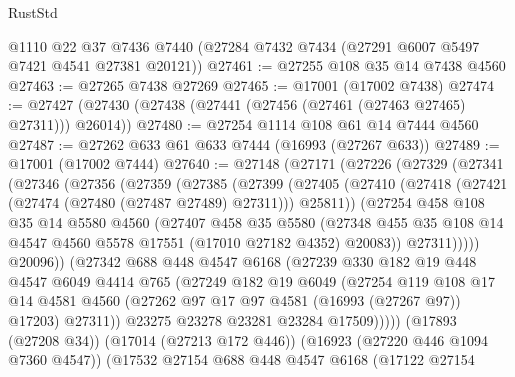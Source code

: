\begin{lexlean}{RustStd}
\begin{coremodule}
    @1110
    @22
    @37
    @7436
    @7440
    (@27284 @7432 @7434 (@27291 @6007 @5497 @7421 @4541 @27381 @20121))
@27461 := @27255 @108 @35 @14 @7438 @4560
@27463 := @27265 @7438 @27269
@27465 := @17001 (@17002 @7438)
@27474 := @27427 (@27430 (@27438 (@27441 (@27456 (@27461 (@27463 @27465) @27311))) @26014))
@27480 := @27254 @1114 @108 @61 @14 @7444 @4560
@27487 := @27262 @633 @61 @633 @7444 (@16993 (@27267 @633))
@27489 := @17001 (@17002 @7444)
@27640 := @27148
    (@27171
      (@27226
        (@27329
          (@27341
            (@27346
              (@27356
                (@27359
                  (@27385
                    (@27399
                      (@27405
                        (@27410 (@27418 (@27421 (@27474 (@27480 (@27487 @27489) @27311))) @25811))
                        (@27254
                          @458
                          @108
                          @35
                          @14
                          @5580
                          @4560
                          (@27407
                            @458
                            @35
                            @5580
                            (@27348
                              @455
                              @35
                              @108
                              @14
                              @4547
                              @4560
                              @5578
                              @17551
                              (@17010 @27182 @4352)
                              @20083))
                          @27311)))))
                @20096))
            (@27342
              @688
              @448
              @4547
              @6168
              (@27239
                @330
                @182
                @19
                @448
                @4547
                @6049
                @4414
                @765
                (@27249
                  @182
                  @19
                  @6049
                  (@27254
                    @119
                    @108
                    @17
                    @14
                    @4581
                    @4560
                    (@27262 @97 @17 @97 @4581 (@16993 (@27267 @97)) @17203)
                    @27311))
                @23275
                @23278
                @23281
                @23284
                @17509)))))
      (@17893 (@27208 @34))
      (@17014 (@27213 @172 @446))
      (@16923 (@27220 @446 @1094 @7360 @4547))
      (@17532
        @27154
        @688
        @448
        @4547
        @6168
        (@17122
          @27154

\end{coremodule}
\end{lexlean}
